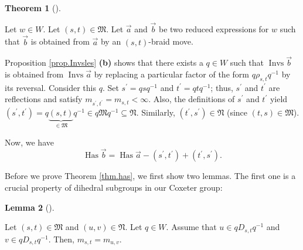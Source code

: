 \documentclass[numbers=enddot,12pt,final,onecolumn,notitlepage,abstracton]{scrartcl}%
\theoremstyle{definition}
\newtheorem{theo}{Theorem}[section]
\newenvironment{theorem}[1][]
{\begin{theo}[#1]\begin{leftbar}}
{\end{leftbar}\end{theo}}
\newtheorem{lem}[theo]{Lemma}
\newenvironment{lemma}[1][]
{\begin{lem}[#1]\begin{leftbar}}
{\end{leftbar}\end{lem}}
\begin{document}
\begin{theorem}
\label{thm.has}Let $w\in W$. Let $\left(  s,t\right)  \in\mathfrak{M}$. Let
$\overrightarrow{a}$ and $\overrightarrow{b}$ be two reduced expressions for
$w$ such that $\overrightarrow{b}$ is obtained from $\overrightarrow{a}$ by an
$\left(  s,t\right)  $-braid move.

Proposition \ref{prop.Invsles} \textbf{(b)} shows that there exists a $q\in W$
such that $\operatorname*{Invs}\overrightarrow{b}$ is obtained from
$\operatorname*{Invs}\overrightarrow{a}$ by replacing a particular factor of
the form $q\rho_{s,t}q^{-1}$ by its reversal. Consider this $q$. Set
$s^{\prime}=qsq^{-1}$ and $t^{\prime}=qtq^{-1}$; thus, $s^{\prime}$ and
$t^{\prime}$ are reflections and satisfy $m_{s^{\prime},t^{\prime}}%
=m_{s,t}<\infty$. Also, the definitions of $s^{\prime}$ and $t^{\prime}$ yield
$\left(  s^{\prime},t^{\prime}\right)  =q\underbrace{\left(  s,t\right)
}_{\in\mathfrak{M}}q^{-1}\in q\mathfrak{M}q^{-1}\subseteq\mathfrak{N}$.
Similarly, $\left(  t^{\prime},s^{\prime}\right)  \in\mathfrak{N}$ (since
$\left(  t,s\right)  \in\mathfrak{M}$).

Now, we have%
\begin{equation}
\operatorname*{Has}\overrightarrow{b}=\operatorname*{Has}\overrightarrow{a}%
-\left(  s^{\prime},t^{\prime}\right)  +\left(  t^{\prime},s^{\prime}\right)
. \label{eq.thm.has.a}%
\end{equation}

\end{theorem}

Before we prove Theorem \ref{thm.has}, we first show two lemmas. The first one
is a crucial property of dihedral subgroups in our Coxeter group:

\begin{lemma}
\label{lem.dihindih}Let $\left(  s,t\right)  \in\mathfrak{M}$ and $\left(
u,v\right)  \in\mathfrak{N}$. Let $q\in W$. Assume that $u\in qD_{s,t}q^{-1}$
and $v\in qD_{s,t}q^{-1}$. Then, $m_{s,t}=m_{u,v}$.
\end{lemma}
\end{document}
